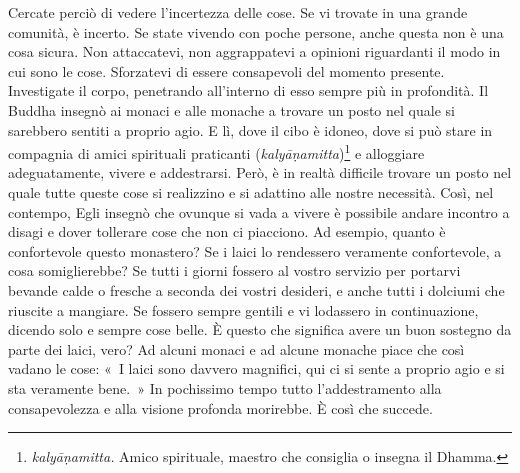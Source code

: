 Cercate perciò di vedere l'incertezza delle cose. Se vi trovate in una
grande comunità, è incerto. Se state vivendo con poche persone, anche
questa non è una cosa sicura. Non attaccatevi, non aggrappatevi a
opinioni riguardanti il modo in cui sono le cose. Sforzatevi di essere
consapevoli del momento presente. Investigate il corpo, penetrando
all'interno di esso sempre più in profondità. Il Buddha insegnò ai
monaci e alle monache a trovare un posto nel quale si sarebbero sentiti
a proprio agio. E lì, dove il cibo è idoneo, dove si può stare in
compagnia di amici spirituali praticanti
(\emph{kalyāṇamitta})\footnote{%
  \emph{kalyāṇamitta.} Amico spirituale, maestro che consiglia o insegna il
  Dhamma.}
e alloggiare adeguatamente, vivere e addestrarsi. Però, è in realtà
difficile trovare un posto nel quale tutte queste cose si realizzino e
si adattino alle nostre necessità. Così, nel contempo, Egli insegnò che
ovunque si vada a vivere è possibile andare incontro a disagi e dover
tollerare cose che non ci piacciono. Ad esempio, quanto è confortevole
questo monastero? Se i laici lo rendessero veramente confortevole, a
cosa somiglierebbe? Se tutti i giorni fossero al vostro servizio per
portarvi bevande calde o fresche a seconda dei vostri desideri, e anche
tutti i dolciumi che riuscite a mangiare. Se fossero sempre gentili e vi
lodassero in continuazione, dicendo solo e sempre cose belle. È questo
che significa avere un buon sostegno da parte dei laici, vero? Ad alcuni
monaci e ad alcune monache piace che così vadano le cose: «~I laici sono
davvero magnifici, qui ci si sente a proprio agio e si sta veramente
bene.~» In pochissimo tempo tutto l'addestramento alla consapevolezza e
alla visione profonda morirebbe. È così che succede.

